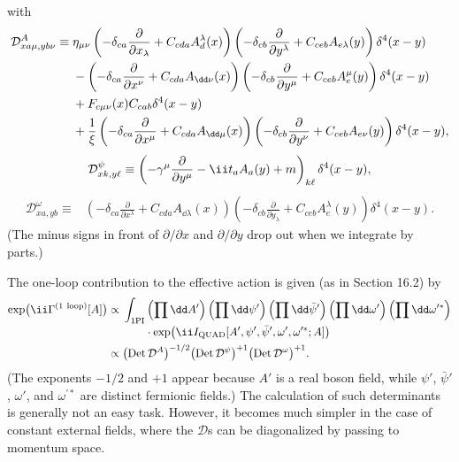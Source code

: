 with
\begin{align}
\mathcal D^A_{xa\mu,yb\nu}\equiv{}&
\eta_{\mu\nu}
\left(-\delta_{ca}\frac{\partial}{\partial x_\lambda}
+C_{cda}A_d^\lambda(x)\right)
\left(-\delta_{cb}\frac{\partial}{\partial y^\lambda}
+C_{ceb}A_{e\lambda}(y)\right)\delta^4(x-y)
\notag\\
&-\left(-\delta_{ca}\frac{\partial}{\partial x^\nu}
+C_{cda}A_{\dd\nu}(x)\right)
\left(-\delta_{cb}\frac{\partial}{\partial y^\mu}
+C_{ceb}A_e^\mu(y)\right)\delta^4(x-y)
\notag\\
&+F_{c\mu\nu}(x)C_{cab}\delta^4(x-y)
\notag\\
&+\frac1\xi
\left(-\delta_{ca}\frac{\partial}{\partial x^\mu}
+C_{cda}A_{\dd\mu}(x)\right)
\left(-\delta_{cb}\frac{\partial}{\partial y^\nu}
+C_{ceb}A_{e\nu}(y)\right)\delta^4(x-y),
\label{eq:17.5.7}
\end{align}
\begin{equation}
\mathcal D^\psi_{xk,y\ell}\equiv
\left(-\gamma^\mu\frac{\partial}{\partial y^\mu}
-\ii t_a\sl{A}_a(y)+m\right)_{k\ell}\delta^4(x-y),
\label{eq:17.5.8}
\end{equation}
\begin{align}
\mathcal D^\omega_{xa,yb}\equiv{}&
\left(-\delta_{ca}\frac{\partial}{\partial x^\lambda}
+C_{cda}A_{\dd\lambda}(x)\right)
\left(-\delta_{cb}\frac{\partial}{\partial y_\lambda}
+C_{ceb}A_e^\lambda(y)\right)\delta^4(x-y).
\label{eq:17.5.9}
\end{align}
(The minus signs in front of $\partial/\partial x$ and $\partial/\partial y$
drop out when we integrate by parts.)

The one-loop contribution to the effective action is given (as in Section
16.2) by
\begin{align}
\exp\bigl(\ii\Gamma^{(1\ \mathrm{loop})}[A]\bigr)\propto{}&
\int_{1\mathrm{PI}}
\left(\prod \dd A'\right)\left(\prod \dd\psi'\right)
\left(\prod \dd\bar\psi'\right)\left(\prod \dd\omega'\right)
\left(\prod \dd\omega^{\prime *}\right)
\notag\\[-2pt]
&\qquad\cdot
\exp\bigl(\ii I_{\mathrm{QUAD}}[A',\psi',\bar\psi',\omega',
\omega^{\prime *};A]\bigr)
\notag\\
\propto{}&
\bigl(\operatorname{Det}\mathcal D^A\bigr)^{-1/2}
\bigl(\operatorname{Det}\mathcal D^\psi\bigr)^{+1}
\bigl(\operatorname{Det}\mathcal D^\omega\bigr)^{+1}.
\label{eq:17.5.10}
\end{align}
(The exponents $-1/2$ and $+1$ appear because $A'$ is a real boson field,
while $\psi'$, $\bar\psi'$, $\omega'$, and $\omega^{\prime *}$ are distinct
fermionic fields.) The calculation of such determinants is generally not
an easy task. However, it becomes much simpler in the case of constant
external fields, where the $\mathcal D$s can be diagonalized by passing to
momentum space.

